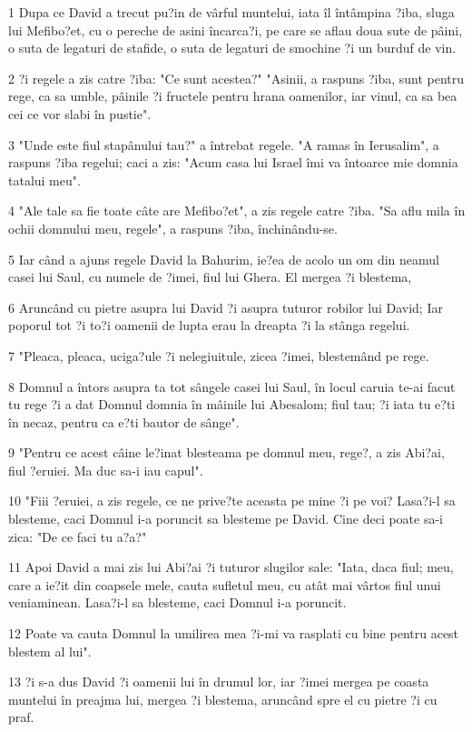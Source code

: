 \par 1 Dupa ce David a trecut pu?in de vârful muntelui, iata îl întâmpina ?iba, sluga lui Mefibo?et, cu o pereche de asini încarca?i, pe care se aflau doua sute de pâini, o suta de legaturi de stafide, o suta de legaturi de smochine ?i un burduf de vin.
\par 2 ?i regele a zis catre ?iba: "Ce sunt acestea?" "Asinii, a raspuns ?iba, sunt pentru rege, ca sa umble, pâinile ?i fructele pentru hrana oamenilor, iar vinul, ca sa bea cei ce vor slabi în pustie".
\par 3 "Unde este fiul stapânului tau?" a întrebat regele. "A ramas în Ierusalim", a raspuns ?iba regelui; caci a zis: "Acum casa lui Israel îmi va întoarce mie domnia tatalui meu".
\par 4 "Ale tale sa fie toate câte are Mefibo?et", a zis regele catre ?iba. "Sa aflu mila în ochii domnului meu, regele", a raspuns ?iba, închinându-se.
\par 5 Iar când a ajuns regele David la Bahurim, ie?ea de acolo un om din neamul casei lui Saul, cu numele de ?imei, fiul lui Ghera. El mergea ?i blestema,
\par 6 Aruncând cu pietre asupra lui David ?i asupra tuturor robilor lui David; Iar poporul tot ?i to?i oamenii de lupta erau la dreapta ?i la stânga regelui.
\par 7 "Pleaca, pleaca, uciga?ule ?i nelegiuitule, zicea ?imei, blestemând pe rege.
\par 8 Domnul a întors asupra ta tot sângele casei lui Saul, în locul caruia te-ai facut tu rege ?i a dat Domnul domnia în mâinile lui Abesalom; fiul tau; ?i iata tu e?ti în necaz, pentru ca e?ti bautor de sânge".
\par 9 "Pentru ce acest câine le?inat blesteama pe domnul meu, rege?, a zis Abi?ai, fiul ?eruiei. Ma duc sa-i iau capul".
\par 10 "Fiii ?eruiei, a zis regele, ce ne prive?te aceasta pe mine ?i pe voi? Lasa?i-l sa blesteme, caci Domnul i-a poruncit sa blesteme pe David. Cine deci poate sa-i zica: "De ce faci tu a?a?"
\par 11 Apoi David a mai zis lui Abi?ai ?i tuturor slugilor sale: "Iata, daca fiul; meu, care a ie?it din coapsele mele, cauta sufletul meu, cu atât mai vârtos fiul unui veniaminean. Lasa?i-l sa blesteme, caci Domnul i-a poruncit.
\par 12 Poate va cauta Domnul la umilirea mea ?i-mi va rasplati cu bine pentru acest blestem al lui".
\par 13 ?i s-a dus David ?i oamenii lui în drumul lor, iar ?imei mergea pe coasta muntelui în preajma lui, mergea ?i blestema, aruncând spre el cu pietre ?i cu praf.
